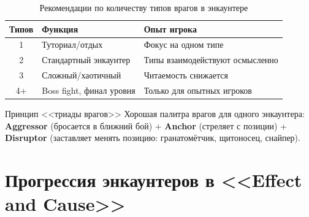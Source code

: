\documentclass[a4paper,11pt]{report}
\begin{document}
\begin{table}[H]
\centering
\caption{Рекомендации по количеству типов врагов в энкаунтере}
\begin{tabularx}{\textwidth}{@{}cXX@{}}
\toprule
\textbf{Типов} & \textbf{Функция} & \textbf{Опыт игрока} \\
\midrule
1 & Туториал/отдых & Фокус на одном типе \\
2 & Стандартный энкаунтер & Типы взаимодействуют осмысленно \\
3 & Сложный/хаотичный & Читаемость снижается \\
4+ & Boss fight, финал уровня & Только для опытных игроков \\
\bottomrule
\end{tabularx}
\end{table}

\begin{principle}{Принцип <<триады врагов>>}
Хорошая палитра врагов для одного энкаунтера:
\textbf{Aggressor} (бросается в ближний бой) +
\textbf{Anchor} (стреляет с позиции) +
\textbf{Disruptor} (заставляет менять позицию:
гранатомётчик, щитоносец, снайпер).
\end{principle}



\section{Прогрессия энкаунтеров в <<Effect and Cause>>}
\end{document}
